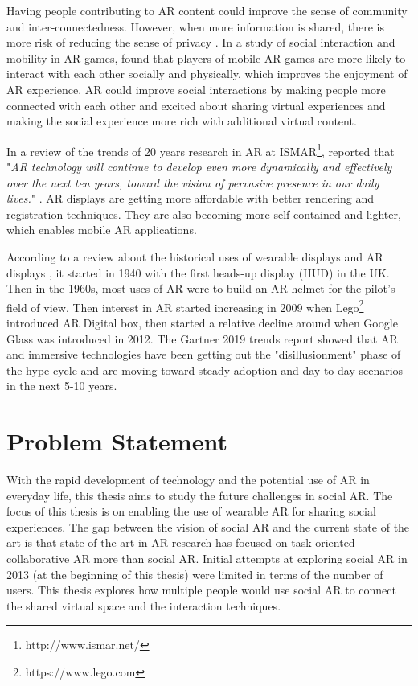 Having people contributing to AR content could improve the sense of community and inter-connectedness. However, when more information is shared, there is more risk of reducing the sense of privacy \cite{Olsson2013}. In a study of social interaction and mobility in AR games, \textcite{Schmalstieg_144} found that players of mobile AR games are more likely to interact with each other socially and physically, which improves the enjoyment of AR experience. AR could improve social interactions by making people more connected with each other and excited about sharing virtual experiences and making the social experience more rich with additional virtual content. 

In a review of the trends of 20 years research in AR at ISMAR\footnote{http://www.ismar.net/}, \textcite{Zhou2008, Kim2018} reported that "\textit{AR technology will continue to develop even more dynamically and effectively over the next ten years, toward the vision of pervasive presence in our daily lives.}" \cite{Kim2018}. AR displays are getting more affordable with better rendering and registration techniques. They are also becoming more self-contained and lighter, which enables mobile AR applications.

According to a review about the historical uses of wearable displays and AR displays \cite{Peddie2017}, it started in 1940 with the first heads-up display (HUD) in the UK. Then in the 1960s, most uses of AR were to build an AR helmet for the pilot's field of view. Then interest in AR started increasing in 2009 when Lego\footnote{https://www.lego.com} introduced AR Digital box, then started a relative decline around when Google Glass was introduced in 2012. The Gartner 2019 trends report \cite{gartner2019} showed that AR and immersive technologies have been getting out the "disillusionment" phase of the hype cycle and are moving toward steady adoption and day to day scenarios in the next 5-10 years.

\section{Problem Statement}

With the rapid development of technology and the potential use of AR in everyday life, this thesis aims to study the future challenges in social AR. The focus of this thesis is on enabling the use of wearable AR for sharing social experiences. The gap between the vision of social AR and the current state of the art is that state of the art in AR research has focused on task-oriented collaborative AR more than social AR. Initial attempts at exploring social AR in 2013 (at the beginning of this thesis) were limited in terms of the number of users. This thesis explores how multiple people would use social AR to connect the shared virtual space and the interaction techniques. 

